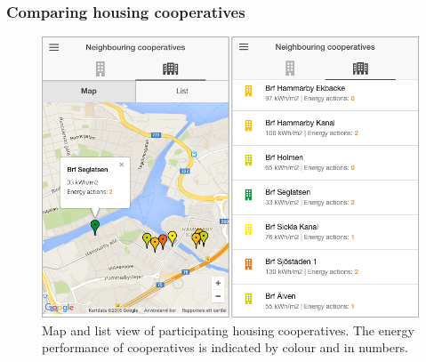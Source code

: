 \subsubsection{Comparing housing cooperatives}

\begin{figure}
	\centering
	\includegraphics[width=0.99\linewidth]{img/Figure202_Housing_cooperatives_comparison.png}
	\caption{Map and list view of participating housing cooperatives. The energy performance of cooperatives is indicated by colour and in numbers.}
	\label{fig:Figure202_Housing_cooperatives_comparison}
\end{figure}

